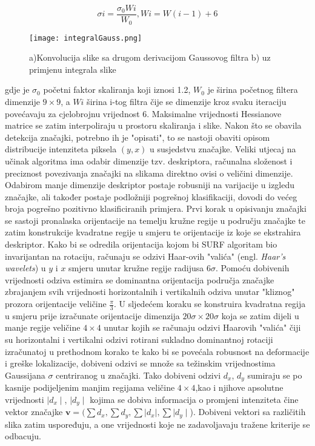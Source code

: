\documentclass[times, utf8, diplomski]{fer}
\begin{document}
$$ \sigma{i} = \frac{\sigma_0 W{i} }{W_0}, W{i} = W{(i-1)}+6   $$

\newpage
\begin{figure}
\texttt{[image: integralGauss.png]}
		\caption{a)Konvolucija slike sa drugom derivacijom Gaussovog filtra b) uz primjenu integrala slike}
		\label{fig:Uspješna registracija dviju akustičnih slika FLS-a}
\end{figure}

gdje je $\sigma_0$ početni faktor skaliranja koji iznosi 1.2, $W_0$ je širina početnog filtera dimenzije $9 \times 9$, a $ W{i}$ širina i-tog filtra čije se dimenzije kroz svaku iteraciju povećavaju za cjelobrojnu vrijednost $6$. Maksimalne vrijednosti Hessianove matrice se zatim interpoliraju u prostoru skaliranja i slike.
Nakon što se obavila detekcija značajki, potrebno ih je "opisati", to se nastoji obaviti opisom distribucije intenziteta piksela $(y,x)$ u susjedstvu značajke. Veliki utjecaj na učinak algoritma ima odabir dimenzije tzv. deskriptora, računalna složenost i preciznost povezivanja značajki na slikama direktno ovisi o veličini dimenzije. Odabirom manje dimenzije deskriptor postaje robusniji na varijacije u izgledu značajke, ali također postaje podložniji pogrešnoj klasifikaciji, dovodi do većeg broja pogrešno pozitivno klasificiranih primjera. Prvi korak u opisivanju značajki se sastoji pronalaska orijentacije na temelju kružne regije u području značajke te zatim konstrukcije kvadratne regije u smjeru te orijentacije iz koje se ekstrahira deskriptor. Kako bi se odredila orijentacija kojom bi SURF algoritam bio invarijantan na rotaciju, računaju se odzivi Haar-ovih "valića" (engl. \textit{Haar's wavelets}) u $y$ i $x$ smjeru unutar kružne regije radijusa $6 \sigma $. Pomoću dobivenih vrijednosti odziva estimira se dominantna orijentacija područja značajke zbrajanjem svih vrijednosti horizontalnih i vertikalnih odziva unutar "kliznog" prozora orijentacije veličine $\frac{\pi}{3}$. U sljedećem koraku se konstruira kvadratna regija u smjeru prije izračunate orijentacije dimenzija $20 \sigma \times 20\sigma$ koja se zatim dijeli u manje regije veličine $4 \times 4$ unutar kojih se računaju odzivi Haarovih "valića" čiji su horizontalni i vertikalni odzivi rotirani sukladno dominantnoj rotaciji izračunatoj u prethodnom korako te kako bi se povećala robusnost na deformacije i greške lokalizacije, dobiveni odzivi se množe sa težinskim vrijednostima Gaussijana $\sigma$ centriranog u značajki. Tako dobiveni odzivi $d_x$, $d_y$  sumiraju se po kasnije podijeljenim manjim regijama veličine $4 \times 4$,kao i njihove apsolutne vrijednosti $ \mid d_x \mid$, $ \mid d_y \mid$ kojima se dobiva informacija o promjeni intenziteta čine vektor značajke $ \textbf{v} = (\sum d_x,\sum d_y,\sum \mid d_x \mid,\sum \mid d_y \mid$). Dobiveni vektori sa različitih slika zatim uspoređuju, a one vrijednosti koje ne zadavoljavaju tražene kriterije se odbacuju.
\end{document}
